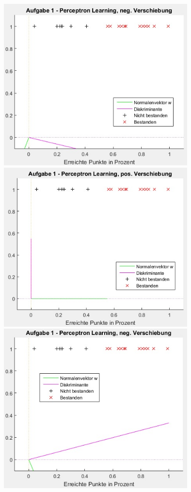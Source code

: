 \documentclass[12pt]{article}
\begin{document}
\newpage
\begin{center}
\includegraphics[width=10cm]{a1_01.jpg}\\
\includegraphics[width=10cm]{a1_02.jpg}
\newpage
\includegraphics[width=10cm]{a1_03.jpg}\\

\end{center}
\end{document}
